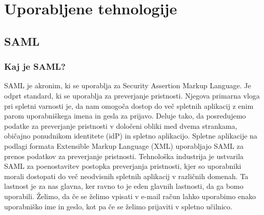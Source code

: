\documentclass[a4paper,12pt,openright]{book}
\begin{document}
\section{Uporabljene tehnologije}
\subsection{SAML}
\subsubsection{Kaj je SAML?}
SAML je akronim, ki se uporablja za Security Assertion Markup Language. Je odprt standard, ki se uporablja za preverjanje pristnosti. Njegova primarna vloga pri spletni varnosti je, da nam omogoča dostop do več spletnih aplikacij z enim parom uporabniškega imena in gesla za prijavo. Deluje tako, da posredujemo podatke za preverjanje pristnosti v določeni obliki med dvema strankama, običajno ponudnikom identitete (idP) in spletno aplikacijo. Spletne aplikacije na podlagi formata Extensible Markup Language (XML) uporabljajo SAML za prenos podatkov za preverjanje pristnosti.
\newline
Tehnološka industrija je ustvarila SAML za poenostavitev postopka preverjanja pristnosti, kjer so uporabniki morali dostopati do več neodvisnih spletnih aplikacij v različnih domenah. Ta lastnost je za nas glavna, ker ravno to je eden glavnih lastnosti, da ga bomo uporabili. Želimo, da če se želimo vpisati v e-mail račun lahko uporabimo enako uporabniško ime in geslo, kot pa če se želimo prijaviti v spletno učilnico. 
\end{document}
